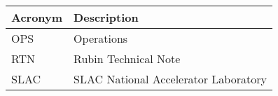\addtocounter{table}{-1}
\begin{longtable}{p{}p{}}\hline
\textbf{Acronym} & \textbf{Description}  \\\hline

OPS & Operations \\\hline
RTN & Rubin Technical Note \\\hline
SLAC & SLAC National Accelerator Laboratory \\\hline
\end{longtable}
